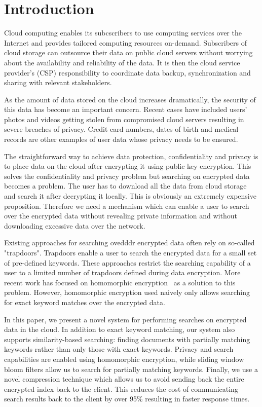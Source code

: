 \section{Introduction}

Cloud computing enables its subcscribers to use computing services over the 
Internet and provides tailored computing resources on-demand. 
Subscribers of cloud storage can outsource their data on public cloud servers
without worrying about the availability and
reliability of the data. It is then the cloud service provider's (CSP) 
responsibility to coordinate data backup, synchronization and sharing
with relevant stakeholders. 

As the amount of data stored on the cloud increases dramatically, the security 
of this data has become an important concern. Recent cases have included users'
photos and videos getting stolen from compromised cloud servers resulting in
severe breaches of privacy. Credit card numbers, dates of birth and medical
records are other examples of user data whose privacy needs to be ensured.

The straightforward way to achieve data protection, confidentiality and privacy is to place data on the cloud after encrypting it using public key encryption. 
This solves the confidentiality and privacy problem
but searching on encrypted data becomes a problem. The user has to download all
the data from cloud storage and search it after decrypting it locally. This is
obviously an extremely expensive proposition. Therefore we need a mechanism 
which can enable a user to search over the encrypted data without revealing 
private information and without downloading excessive data over the network.

Existing approaches for searching ovedddr encrypted data often rely on so-called
"trapdoors". Trapdoors enable a user to search the encrypted data for a small 
set of pre-defined keywords. These approaches restrict the searching
capability of a user to a limited number of trapdoors defined during data 
encryption. More recent work has focused on homomorphic encryption~\cite{craig} as a solution
to this problem. However, homomorphic encryption used naively only allows
searching for exact keyword matches over the encrypted data. 

In this paper, we present a novel system for performing searches on encrypted 
data in the cloud. In addition to exact keyword matching, our system also
supports similarity-based searching: finding documents with partially matching 
keywords rather than only those with exact keywords. Privacy and search 
capabilities are enabled using homomorphic encryption, while sliding window 
bloom filters allow us to search for partially matching keywords. Finally, we
use a novel compression technique which allows us to avoid sending back the
entire encrypted index back to the client. This reduces the cost of
communicating search results back to the client by over 95\% resulting in 
faster response times.

